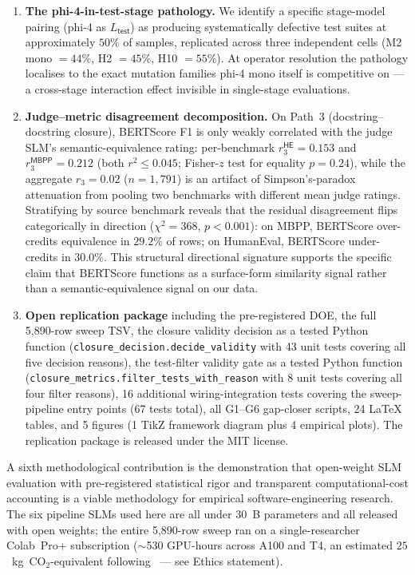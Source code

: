 \begin{enumerate}
  \item \textbf{The phi-4-in-test-stage pathology.} We identify a specific stage-model pairing (phi-4 as $L_{\textsf{test}}$) as producing systematically defective test suites at approximately $50\%$ of samples, replicated across three independent cells (M2 mono $= 44\%$, H2 $= 45\%$, H10 $= 55\%$). At operator resolution the pathology localises to the exact mutation families phi-4 mono itself is competitive on --- a cross-stage interaction effect invisible in single-stage evaluations.

  \item \textbf{Judge--metric disagreement decomposition.} On Path~3 (docstring--docstring closure), BERTScore F1 is only weakly correlated with the judge SLM's semantic-equivalence rating: per-benchmark $r_3^{\textsf{HE}} = 0.153$ and $r_3^{\textsf{MBPP}} = 0.212$ (both $r^2 \leq 0.045$; Fisher-$z$ test for equality $p = 0.24$), while the aggregate $r_3 = 0.02$ ($n = 1{,}791$) is an artifact of Simpson's-paradox attenuation from pooling two benchmarks with different mean judge ratings. Stratifying by source benchmark reveals that the residual disagreement flips categorically in direction ($\chi^2 = 368$, $p < 0.001$): on MBPP, BERTScore over-credits equivalence in $29.2\%$ of rows; on HumanEval, BERTScore under-credits in $30.0\%$. This structural directional signature supports the specific claim that BERTScore functions as a surface-form similarity signal rather than a semantic-equivalence signal on our data.

  \item \textbf{Open replication package} including the pre-registered DOE, the full 5{,}890-row sweep TSV, the closure validity decision as a tested Python function (\texttt{closure\_decision.decide\_validity} with 43 unit tests covering all five decision reasons), the test-filter validity gate as a tested Python function (\texttt{closure\_metrics.filter\_tests\_with\_reason} with 8 unit tests covering all four filter reasons), 16 additional wiring-integration tests covering the sweep-pipeline entry points (67 tests total), all G1--G6 gap-closer scripts, 24 LaTeX tables, and 5 figures (1 TikZ framework diagram plus 4 empirical plots). The replication package is released under the MIT license.
\end{enumerate}

A sixth methodological contribution is the demonstration that open-weight SLM evaluation with pre-registered statistical rigor and transparent computational-cost accounting is a viable methodology for empirical software-engineering research. The six pipeline SLMs used here are all under 30~B parameters and all released with open weights; the entire 5{,}890-row sweep ran on a single-researcher Colab~Pro+ subscription ($\sim$530 GPU-hours across A100 and T4, an estimated $25$~kg~CO$_2$-equivalent following~\citet{Lacoste2019MLCO2Emissions} --- see Ethics statement).

